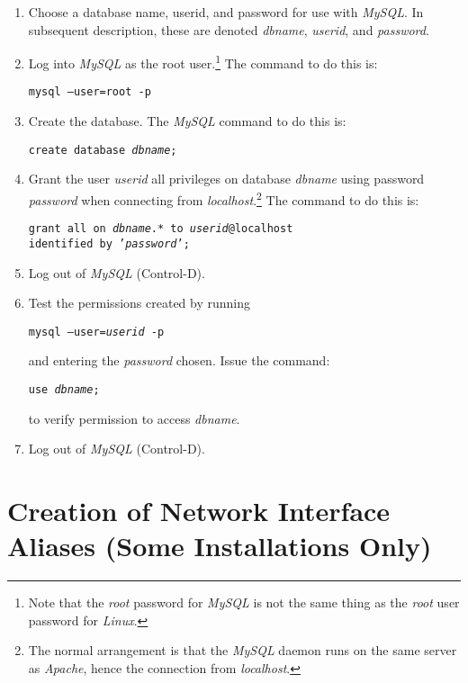 \begin{enumerate}
\item Choose a database name, userid, and password
      for use with \emph{MySQL}.  In subsequent description, these
      are denoted \emph{dbname}, \emph{userid},
      and \emph{password}.
\item Log into \emph{MySQL} as the root user.\footnote{Note that the
      \emph{root} password for \emph{MySQL} is not the same
      thing as the \emph{root} user password for \emph{Linux}.}
      The command to do this is:

      \texttt{mysql --user=root -p}
\item Create the database.  The \emph{MySQL} command to do this is:

      \texttt{create database \emph{dbname};}
\item Grant the user \emph{userid} all privileges on database
      \emph{dbname} using password \emph{password} when connecting
      from \emph{localhost}.\footnote{The normal arrangement is that the
      \emph{MySQL} daemon runs on the same server as \emph{Apache}, hence
      the connection from \emph{localhost}.}  The command to do this is:

      \texttt{grant all on \emph{dbname}.* to \emph{userid}@localhost\\identified by '\emph{password}';}
\item Log out of \emph{MySQL} (Control-D).
\item Test the permissions created by running

      \texttt{mysql --user=\emph{userid} -p}

      and entering the \emph{password} chosen.  Issue the command:

      \texttt{use \emph{dbname};}

      to verify permission to access \emph{dbname}.
\item Log out of \emph{MySQL} (Control-D).
\end{enumerate}


\section{Creation of Network Interface Aliases (Some Installations Only)}
\label{cist0:scna0}

